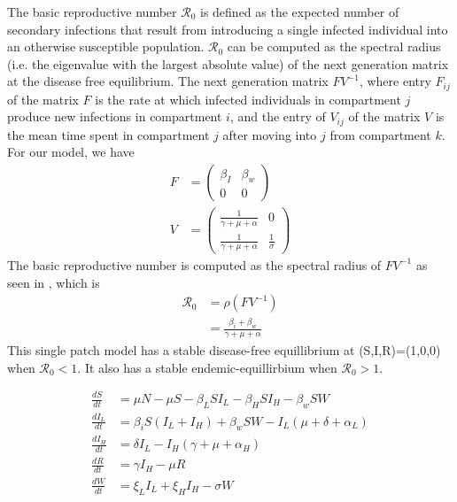 \documentclass[12pt]{article}\usepackage[]{graphicx}\usepackage[]{color}
\begin{document}
The basic reproductive number ${\mathcal R_0}$ is defined as the expected number of secondary infections that result from introducing a single infected individual into an otherwise susceptible
population.
${\mathcal R_0}$ can be computed as the spectral radius (i.e. the eigenvalue with the largest absolute value) of the next generation matrix at the disease free equilibrium.
The next generation matrix $FV^{−1}$, where entry $F_{ij}$ of the matrix $F$ is the rate at which infected individuals in compartment $j$ produce new infections in compartment $i$, and the entry of $V_{ij}$ of the matrix $V$ is the mean time spent in compartment $j$ after moving into $j$ from compartment $k$.
For our model, we have
\begin{align*}
		F&=\begin{pmatrix}
			\beta_I & \beta_w\\
			0 & 0
			\end{pmatrix}\\
		V&=\begin{pmatrix}
			\frac{1}{\gamma+\mu+\alpha} & 0\\
			\frac{1}{\gamma+\mu+\alpha} &\frac{1}{\sigma}
			\end{pmatrix}
\end{align*}
The basic reproductive number is computed as the spectral radius of $FV^{-1}$ as seen in \cite{link9}, which is
\begin{align*}
    {\mathcal R_0} &= \rho(FV^{-1})\\
		           &=\frac{\beta_i+\beta_w}{\gamma+\mu+\alpha}
\end{align*}
This single patch model has a stable disease-free equillibrium at (S,I,R)=(1,0,0) when ${\mathcal R_0}<1$.
It also has a stable endemic-equillirbium when ${\mathcal R_0}>1$.

\begin{align*}
	\frac{dS}{dt}&= \mu N - \mu S - \beta_L S I_L - \beta_H S I_H - \beta_w S W  \\
	\frac{dI_L}{dt}&= \beta_i S( I_L + I_H) + \beta_w S W - I_L (\mu + \delta + \alpha_L) \\
	\frac{dI_H}{dt}&= \delta I_L - I_H (\gamma + \mu + \alpha_H) \\
	\frac{dR}{dt}&= \gamma I_H - \mu R \\
	\frac{dW}{dt}&= \xi_L I_L + \xi_H I_H  - \sigma W\\
	\end{align*}
\end{document}
